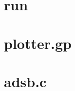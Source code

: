 \section{run}
	
\section{plotter.gp}
    \label{plotter.gp}
	
\section{adsb.c}
    \label{adsb.c}
    
%





